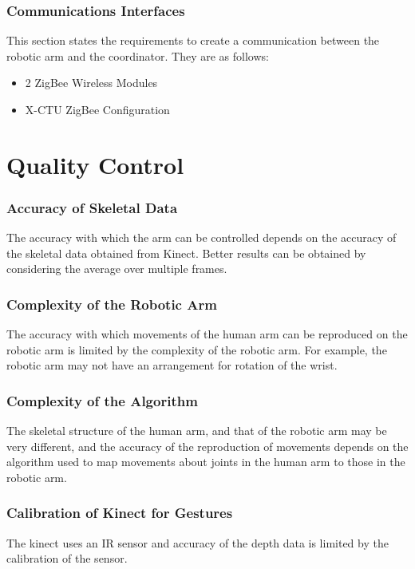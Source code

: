 \documentclass[a4wide]{scrreprt}
\begin{document}
\subsection{Communications Interfaces}
This section states the requirements to create a communication between the robotic arm and the coordinator. They are as follows:
\begin{itemize}
\item 2 ZigBee Wireless Modules
\item X-CTU ZigBee Configuration
\end{itemize}

\chapter{Quality Control}
\subsection*{Accuracy of Skeletal Data}
The accuracy with which the arm can be controlled depends on the accuracy of the skeletal data obtained from Kinect. Better results can be obtained by considering the average over multiple frames.

\subsection*{Complexity of the Robotic Arm}
The accuracy with which movements of the human arm can be reproduced on the robotic arm is limited by the complexity of the robotic arm. For example, the robotic arm may not have an arrangement for rotation of the wrist.

\subsection*{Complexity of the Algorithm}
The skeletal structure of the human arm, and that of the robotic arm may be very different, and the accuracy of the reproduction of movements depends on the algorithm used to map movements about joints in the human arm to those in the robotic arm.
\subsection*{Calibration of Kinect for Gestures}
The kinect uses an IR sensor and accuracy of the depth data is limited by the calibration of the sensor.
\end{document}
